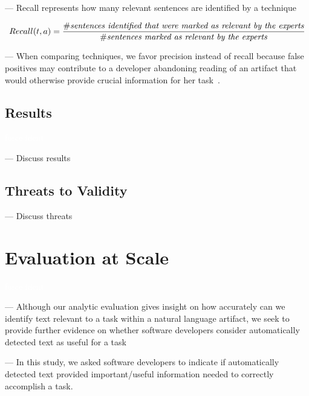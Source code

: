\vspace{3mm}

--- Recall represents how many relevant sentences are identified by a technique


\begin{equation}
    Recall(t, a) = \frac{\# \text{\textit{sentences identified that were marked as relevant by the experts}}}{\# \text{\textit{sentences marked as relevant by the experts}}}
\end{equation}

\vspace{3mm}

--- When comparing techniques, we favor precision instead of recall because false positives may contribute to a developer abandoning reading of an artifact that would otherwise provide crucial information for her task~\cite{Rastkar2010}.


\subsection{Results}
\textcolor{white}{force ident} %

--- Discuss results \vspace{3mm}

\subsection{Threats to Validity}

--- Discuss threats \vspace{3mm}

\clearpage


\section{Evaluation at Scale}
\textcolor{white}{force ident} %



--- Although our analytic evaluation gives insight on how accurately can we identify text relevant to a task within a natural language artifact, we seek to provide further evidence on whether software developers consider automatically detected text as useful for a task 

--- In this study, we asked software developers to indicate if automatically detected text provided important/useful information needed to correctly accomplish a task.

